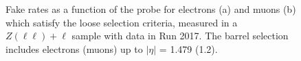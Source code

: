 \begin{figure}[!htb]
\begin{center}

    \caption{
        Fake rates as a function of the probe \pt for  electrons (a) and muons (b) which satisfy the loose selection criteria, measured in
        a $Z(\ell\ell)+\ell$ sample with data in Run 2017.
        The barrel selection includes electrons (muons) up to $|\eta|$ = 1.479 (1.2).
    }
\label{fig:os_fakerates_17}
\end{center}
\end{figure}


